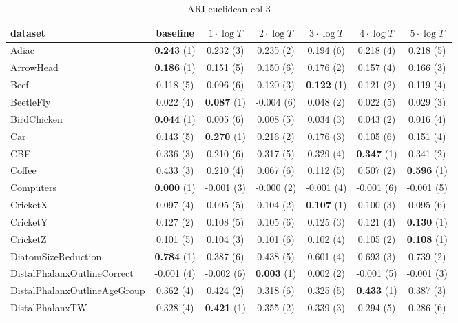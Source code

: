 \begin{table}[ht]
\caption{ARI euclidean col 3} 
\begin{adjustbox}{width=\textwidth}
\begin{tabular}{lcccccc}
\hline
dataset & baseline & \textbf{$1\cdot \log{T}$} & \textbf{$2\cdot \log{T}$} & \textbf{$3\cdot \log{T}$} & \textbf{$4\cdot \log{T}$} & \textbf{$5\cdot \log{T}$} \\ \hline
Adiac & \textbf{0.243} (1) & 0.232 (3) & 0.235 (2) & 0.194 (6) & 0.218 (4) & 0.218 (5) \\
ArrowHead & \textbf{0.186} (1) & 0.151 (5) & 0.150 (6) & 0.176 (2) & 0.157 (4) & 0.166 (3) \\
Beef & 0.118 (5) & 0.096 (6) & 0.120 (3) & \textbf{0.122} (1) & 0.121 (2) & 0.119 (4) \\
BeetleFly & 0.022 (4) & \textbf{0.087} (1) & -0.004 (6) & 0.048 (2) & 0.022 (5) & 0.029 (3) \\
BirdChicken & \textbf{0.044} (1) & 0.005 (6) & 0.008 (5) & 0.034 (3) & 0.043 (2) & 0.016 (4) \\
Car & 0.143 (5) & \textbf{0.270} (1) & 0.216 (2) & 0.176 (3) & 0.105 (6) & 0.151 (4) \\
CBF & 0.336 (3) & 0.210 (6) & 0.317 (5) & 0.329 (4) & \textbf{0.347} (1) & 0.341 (2) \\
Coffee & 0.433 (3) & 0.210 (4) & 0.067 (6) & 0.112 (5) & 0.507 (2) & \textbf{0.596} (1) \\
Computers & \textbf{0.000} (1) & -0.001 (3) & -0.000 (2) & -0.001 (4) & -0.001 (6) & -0.001 (5) \\
CricketX & 0.097 (4) & 0.095 (5) & 0.104 (2) & \textbf{0.107} (1) & 0.100 (3) & 0.095 (6) \\
CricketY & 0.127 (2) & 0.108 (5) & 0.105 (6) & 0.125 (3) & 0.121 (4) & \textbf{0.130} (1) \\
CricketZ & 0.101 (5) & 0.104 (3) & 0.101 (6) & 0.102 (4) & 0.105 (2) & \textbf{0.108} (1) \\
DiatomSizeReduction & \textbf{0.784} (1) & 0.387 (6) & 0.438 (5) & 0.601 (4) & 0.693 (3) & 0.739 (2) \\
DistalPhalanxOutlineCorrect & -0.001 (4) & -0.002 (6) & \textbf{0.003} (1) & 0.002 (2) & -0.001 (5) & -0.001 (3) \\
DistalPhalanxOutlineAgeGroup & 0.362 (4) & 0.424 (2) & 0.318 (6) & 0.325 (5) & \textbf{0.433} (1) & 0.387 (3) \\
DistalPhalanxTW & 0.328 (4) & \textbf{0.421} (1) & 0.355 (2) & 0.339 (3) & 0.294 (5) & 0.286 (6) \\

\end{tabular}
\end{adjustbox}
\end{table}
